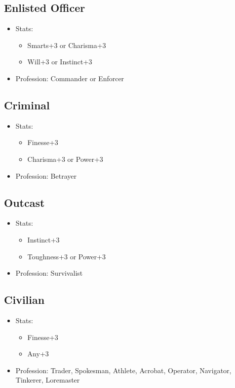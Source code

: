 \subsection{Enlisted Officer}
\begin{itemize}
	\item Stats:
	\begin{itemize}
		\item Smarts+3 or Charisma+3
		\item Will+3 or Instinct+3
	\end{itemize}
	\item Profession: Commander or Enforcer
\end{itemize}

\subsection{Criminal}
\begin{itemize}
	\item Stats:
	\begin{itemize}
		\item Finesse+3
		\item Charisma+3 or Power+3
	\end{itemize}
	\item Profession: Betrayer
\end{itemize}

\subsection{Outcast}
\begin{itemize}
	\item Stats:
	\begin{itemize}
		\item Instinct+3
		\item Toughness+3 or Power+3
	\end{itemize}
	\item Profession: Survivalist
\end{itemize}

\subsection{Civilian}
\begin{itemize}
	\item Stats:
	\begin{itemize}
		\item Finesse+3
		\item Any+3
	\end{itemize}
	\item Profession: Trader, Spokesman, Athlete, Acrobat, Operator, Navigator, Tinkerer, Loremaster
\end{itemize}
